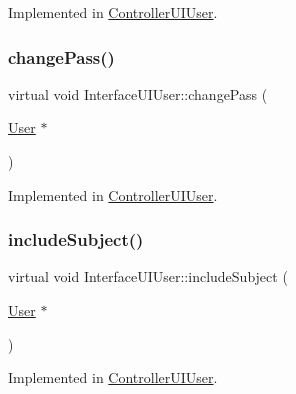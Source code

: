 Implemented in \hyperlink{class_controller_u_i_user_a294982fc334de0b9a520823ff05b545e}{Controller\+U\+I\+User}.

\mbox{\label{class_interface_u_i_user_a56170420b7ce8f3a69c1097aa4fb19d7}} 
\subsubsection{\texorpdfstring{change\+Pass()}{changePass()}}
{\footnotesize\ttfamily virtual void Interface\+U\+I\+User\+::change\+Pass (\begin{DoxyParamCaption}\item[{\hyperlink{class_user}{User} $\ast$}]{ }\end{DoxyParamCaption})\hspace{0.3cm}{\ttfamily [pure virtual]}}



Implemented in \hyperlink{class_controller_u_i_user_a769122f009fe45b3c9f4f63afe5c043e}{Controller\+U\+I\+User}.

\mbox{\label{class_interface_u_i_user_a9e578488a9effc0f41f4ac034b6744cf}} 
\subsubsection{\texorpdfstring{include\+Subject()}{includeSubject()}}
{\footnotesize\ttfamily virtual void Interface\+U\+I\+User\+::include\+Subject (\begin{DoxyParamCaption}\item[{\hyperlink{class_user}{User} $\ast$}]{ }\end{DoxyParamCaption})\hspace{0.3cm}{\ttfamily [pure virtual]}}



Implemented in \hyperlink{class_controller_u_i_user_a9bf2ce224d3d3064542c89a287cb93ca}{Controller\+U\+I\+User}.

\mbox{\label{class_interface_u_i_user_a167f4ea2954c5b4e81d175bca1cee1f9}} 

